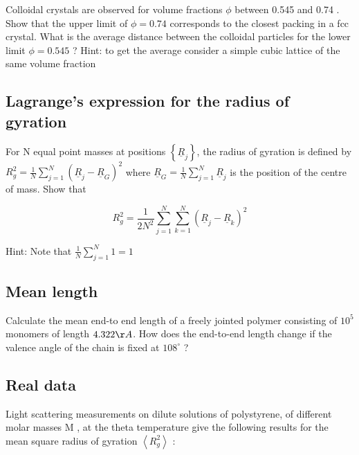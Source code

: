 \documentclass[
  letterpaper,
  enabledeprecatedfontcommands]{report}
\begin{document}
Colloidal crystals are observed for volume fractions \(\phi\) between
0.545 and 0.74 . Show that the upper limit of \(\phi=0.74\) corresponds
to the closest packing in a fcc crystal. What is the average distance
between the colloidal particles for the lower limit \(\phi=0.545\) ?
Hint: to get the average consider a simple cubic lattice of the same
volume fraction

\subsection{Lagrange's expression for the radius of
gyration}\label{lagranges-expression-for-the-radius-of-gyration}

For N equal point masses at positions
\(\left\{\underline{R}_{j}\right\}\), the radius of gyration is defined
by
\(R_{g}^{2}=\frac{1}{N} \sum_{j=1}^{N}\left(\underline{R}_{j}-\underline{R}_{G}\right)^{2}\)
where \(\underline{R}_{G}=\frac{1}{N} \sum_{j=1}^{N} \underline{R}_{j}\)
is the position of the centre of mass. Show that

\[
R_{g}^{2}=\frac{1}{2 N^{2}} \sum_{j=1}^{N} \sum_{k=1}^{N}\left(\underline{R}_{j}-\underline{R}_{k}\right)^{2}
\]

Hint: Note that \(\frac{1}{N} \sum_{j=1}^{N} 1=1\)

\subsection{Mean length}\label{mean-length}

Calculate the mean end-to end length of a freely jointed polymer
consisting of \(10^{5}\) monomers of length \(4.322 \AA\). How does the
end-to-end length change if the valence angle of the chain is fixed at
\(108^{\circ}\) ?

\subsection{Real data}\label{real-data}

Light scattering measurements on dilute solutions of polystyrene, of
different molar masses M , at the theta temperature give the following
results for the mean square radius of gyration
\(\left\langle R_{g}^{2}\right\rangle\) :
\end{document}
